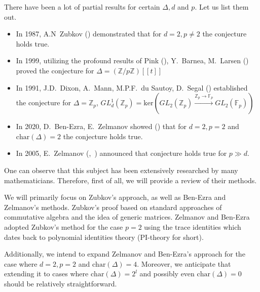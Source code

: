\documentclass[12pt,a4paper]{article}
\begin{document}
    There have been a lot of partial results for certain $\Delta, d$ and $p$.
    Let us list them out.
    \begin{itemize}
        \item In 1987, A.N\ Zubkov (\cite{Zubkov}) demonstrated that for $d=2, p\neq2$ the conjecture holds true.
        \item In 1999, utilizing the profound results of Pink (\cite{Pink}), Y.\ Barnea, M.\ Larsen (\cite{Barnea-Larsen}) proved the conjecture for $\Delta=\left( \mathbb{Z}/p\mathbb{Z} \right)[[t]]$
        \item In 1991, J.D.\ Dixon, A.\ Mann, M.P.F.\ du Sautoy, D.\ Segal (\cite{DMSD}) established the conjecture for $\Delta=\mathbb{Z}_p$, $GL_d^1(\mathbb{Z}_p)=\mathrm{ker}\left( GL_2(\mathbb{Z}_p) \xrightarrow{\mathbb{Z}_p\to\mathbb{F}_p} GL_2(\mathbb{F}_p) \right)$
        \item In 2020, D.\ Ben-Ezra, E.\ Zelmanov showed (\cite{Ben-Ezra-Zelmanov}) that for $d=2, p=2$ and $\mathrm{char}(\Delta)=2$  the conjecture holds true.
        \item In 2005, E.\ Zelmanov (\cite{Zelmanov1},~\cite{Zelmanov2}) announced that conjecture holds true for $p\gg d$.
    \end{itemize}


    One can observe that this subject has been extensively researched by many mathematicians.
    Therefore, first of all, we will provide a review of their methods.

    We will primarily focus on Zubkov's approach, as well as Ben-Ezra and Zelmanov's methods.
    Zubkov's proof based on standard approaches of commutative algebra and the idea of generic matrices.
    Zelmanov and Ben-Ezra adopted Zubkov's method for the case $p=2$ using the trace identities which dates back to polynomial identities theory (PI-theory for short).

    Additionally, we intend to expand Zelmanov and Ben-Ezra's approach for the case where $d=2, p=2$ and $\mathrm{char}(\Delta)=4$.
    Moreover, we anticipate that extending it to cases where $\mathrm{char}(\Delta)=2^l$ and possibly even $\mathrm{char}(\Delta)=0$ should be relatively straightforward.
\end{document}

